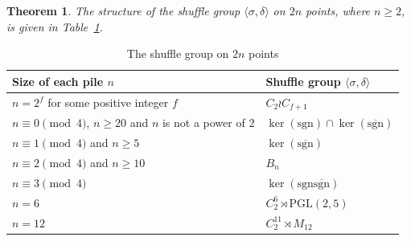 \documentclass[12pt]{amsart}
\newtheorem{thm}{Theorem}[section]
\theoremstyle{remark}
\theoremstyle{definition}
\begin{document}
\begin{thm} \cite[Theorem 1]{DGK} \label{dgk}
The structure of the  shuffle group $\langle \sigma, \delta \rangle$ on $2n$ points, where $n\geqslant2$, is given in Table~\ref{tab:the shuffle group}.
\end{thm}

\begin{table}[h]
\label{tab:the shuffle group}
\begin{tabular}{ l | l }
Size of each pile $n$ & Shuffle group $\langle \sigma , \delta \rangle$ \\
\hline %
$n=2^f$ for some positive integer $f$ &  $C_2 \wr C_{f+1}$ \\ %
$n\equiv 0 \pmod{4}$, $n\geqslant 20$ and $n$ is not a power of $2$ &  $\ker(\mathrm{sgn}) \cap \ker(\overline{\mathrm{sgn}})$  \\ %
$n\equiv 1 \pmod{4}$ and $n\geqslant 5 $ &  $ \ker(\overline{\mathrm{sgn}})$  \\ %
$n\equiv 2 \pmod{4}$ and $n\geqslant 10$  &  $B_n$  \\ %
$n\equiv 3 \pmod{4}$ &  $\ker(\mathrm{sgn}\overline{\mathrm{sgn}})$  \\ %
$n=6$ &  $C_2^6 \rtimes \mathrm{PGL}(2,5)$  \\ %
$n=12$ &  $C_2^{11} \rtimes   M_{12}$\\ \hline
\end{tabular}
\smallskip
\caption{The   shuffle group on $2n$ points}
\end{table}
\end{document}
